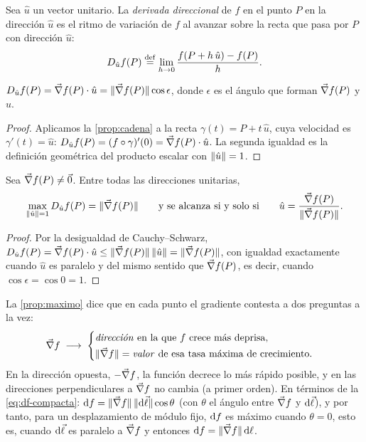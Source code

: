 \begin{definicion}\label{def:direccional}
Sea $\hat u$ un vector unitario. La \emph{derivada direccional} de $f$ en el
punto $P$ en la dirección $\hat u$ es el ritmo de variación de $f$ al avanzar
sobre la recta que pasa por $P$ con dirección $\hat u$:
\[
  D_{\hat u}f(P)\mathrel{\overset{\mathrm{def}}{=}}\lim_{h\to0}\frac{f(P+h\,\hat u)-f(P)}{h}.
\]
\end{definicion}

\begin{proposicion}\label{prop:direccional}
$D_{\hat u}f(P)=\vec{\nabla} f(P)\cdot\hat u=\lVert \vec{\nabla} f(P)\rVert\cos\epsilon$, donde
$\epsilon$ es el ángulo que forman $\vec{\nabla} f(P)$ y $\hat u$.
\end{proposicion}
\begin{proof}
Aplicamos la \cref{prop:cadena} a la recta $\gamma(t)=P+t\,\hat u$, cuya
velocidad es $\gamma'(t)=\hat u$: $D_{\hat u}f(P)=(f\circ\gamma)'(0)=\vec{\nabla} f(P)\cdot\hat u$.
La segunda igualdad es la definición geométrica del producto escalar con
$\lVert \hat u\rVert=1$.
\end{proof}

\begin{proposicion}\label{prop:maximo}
Sea $\vec{\nabla} f(P)\neq\vec{0}$. Entre todas las direcciones unitarias,
\[
  \max_{\lVert \hat u\rVert=1}D_{\hat u}f(P)=\lVert \vec{\nabla} f(P)\rVert
  \qquad\text{y se alcanza si y solo si}\qquad
  \hat u=\frac{\vec{\nabla} f(P)}{\lVert \vec{\nabla} f(P)\rVert}.
\]
\end{proposicion}
\begin{proof}
Por la desigualdad de Cauchy--Schwarz,
$D_{\hat u}f(P)=\vec{\nabla} f(P)\cdot\hat u\le\lVert \vec{\nabla} f(P)\rVert\,\lVert \hat u\rVert=\lVert \vec{\nabla} f(P)\rVert$,
con igualdad exactamente cuando $\hat u$ es paralelo y del mismo sentido que
$\vec{\nabla} f(P)$, es decir, cuando $\cos\epsilon=\cos0=1$.
\end{proof}

\begin{observacion}\label{obs:dos-preguntas}
La \cref{prop:maximo} dice que en cada punto el gradiente contesta a dos
preguntas a la vez:
\[
  \vec{\nabla} f\;\longrightarrow\;
  \begin{cases}
    \text{\emph{dirección} en la que $f$ crece más deprisa,}\\[2pt]
    \lVert \vec{\nabla} f\rVert=\text{\emph{valor} de esa tasa máxima de crecimiento.}
  \end{cases}
\]
En la dirección opuesta, $-\vec{\nabla} f$, la función decrece lo más rápido posible,
y en las direcciones perpendiculares a $\vec{\nabla} f$ no cambia (a primer orden).
En términos de la \cref{eq:df-compacta}: $\mathrm{d} f=\lVert \vec{\nabla} f\rVert\,\lVert \mathrm{d}\vec{\ell}\rVert\cos\theta$ (con $\theta$ el ángulo entre $\vec{\nabla} f$ y $\mathrm{d}\vec{\ell}$),
y por tanto, para un desplazamiento de módulo fijo, $\mathrm{d} f$ es máximo cuando
$\theta=0$, esto es, cuando $\mathrm{d}\vec{\ell}$ es paralelo a $\vec{\nabla} f$ y entonces
$\mathrm{d} f=\lVert \vec{\nabla} f\rVert\,\mathrm{d}\ell$.
\end{observacion}

